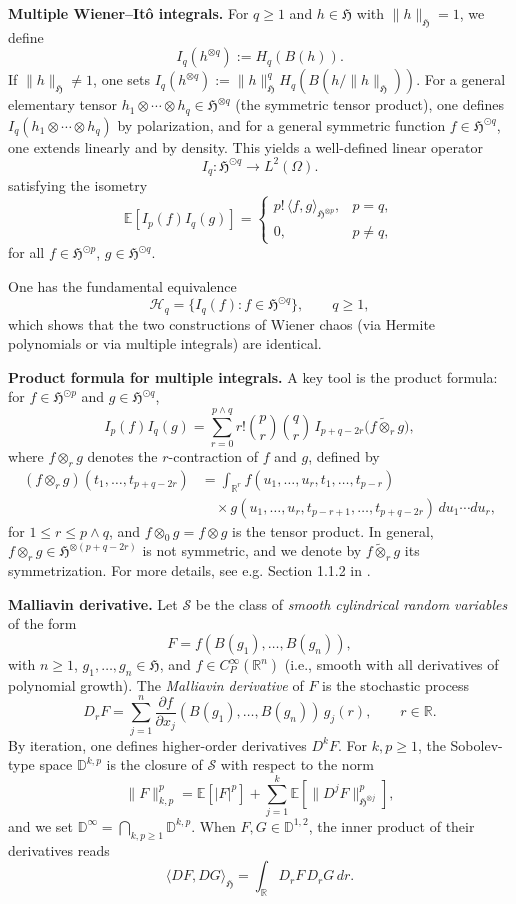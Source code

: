 \documentclass[a4paper,10pt]{article}
\theoremstyle{definition}
\theoremstyle{plain}
\newcommand{\R}{\mathbb{R}}
\newcommand{\E}{\mathbb{E}}
\newcommand\HHH{\mathfrak{H}}
\newcommand\D{\mathbb{D}}
\newcommand\1{\mathbbm{1}}
\begin{document}
\medskip
\noindent\textbf{Multiple Wiener–Itô integrals.}  
For $q\ge1$ and $h\in\HHH$ with $\|h\|_{\HHH}=1$, we define
\[
I_q(h^{\otimes q}) := H_q(B(h)).
\]
If $\|h\|_{\HHH}\ne1$, one sets $I_q(h^{\otimes q}) := \|h\|_{\HHH}^q H_q(B(h/\|h\|_{\HHH}))$.  
For a general elementary tensor $h_1\otimes\cdots\otimes h_q\in\HHH^{\otimes q}$ (the symmetric tensor product), one defines $I_q(h_1\otimes\cdots\otimes h_q)$ by polarization, and for a general symmetric function $f\in\HHH^{\odot q}$, one extends linearly and by density.  
This yields a well-defined linear operator
\[
I_q:\HHH^{\odot q}\to L^2(\Omega).
\]
satisfying the isometry
\[
\E[I_p(f)I_q(g)] =
\begin{cases}
p!\,\langle f,g\rangle_{\HHH^{\otimes p}}, & p=q,\\
0, & p\ne q,
\end{cases}
\]
for all $f\in\HHH^{\odot p}$, $g\in\HHH^{\odot q}$.  

One has the fundamental equivalence
$$
\mathcal H_q = \{ I_q(f): f\in \HHH^{\odot q}\}, \qquad q\ge1,
$$
which shows that the two constructions of Wiener chaos (via Hermite polynomials  or via multiple integrals) are identical.

\medskip

\noindent\textbf{Product formula for multiple integrals.}  
A key tool is the product formula: for $f\in\HHH^{\odot p}$ and $g\in\HHH^{\odot q}$,
\begin{equation}\label{prod}
I_p(f)I_q(g)= \sum_{r=0}^{p\wedge q} r!\binom{p}{r}\binom{q}{r}\,
I_{p+q-2r}\big(f\widetilde{\otimes}_r g\big),
\end{equation}
where $f\otimes_r g$ denotes the $r$-contraction of $f$ and $g$, defined by
\begin{align}\label{contra}
(f\otimes_r g)(t_{1},\ldots,t_{p+q-2r})
&= \int_{\R^{r}} f(u_{1},\ldots,u_{r}, t_{1},\ldots,t_{p-r}) \nonumber \\
&\quad \times g(u_{1},\ldots,u_{r}, t_{p-r+1},\ldots,t_{p+q-2r})\,du_{1}\cdots du_{r},
\end{align}
for $1\le r\le p\wedge q$, and $f\otimes_0 g = f\otimes g$ is the tensor product.  
In general, $f\otimes_r g\in\HHH^{\otimes(p+q-2r)}$ is not symmetric, and we denote by $f\widetilde{\otimes}_r g$ its symmetrization.  
For more details, see e.g. Section 1.1.2 in \cite{Nualart}.


\medskip
\noindent\textbf{Malliavin derivative.}  
Let $\mathcal S$ be the class of \emph{smooth cylindrical random variables} of the form
\[
F = f(B(g_1),\dots,B(g_n)),
\]
with $n\ge1$, $g_1,\dots,g_n\in\HHH$, and $f\in C^\infty_P(\R^n)$ (i.e., smooth with all derivatives of polynomial growth).  
The \emph{Malliavin derivative} of $F$ is the stochastic process
\[
D_r F = \sum_{j=1}^n \frac{\partial f}{\partial x_j}(B(g_1),\dots,B(g_n))\, g_j(r), \qquad r\in\R.
\]
By iteration, one defines higher-order derivatives $D^kF$.  
For $k,p\ge1$, the Sobolev-type space $\D^{k,p}$ is the closure of $\mathcal S$ with respect to the norm
\[
\|F\|_{k,p}^p = \E[|F|^p] + \sum_{j=1}^k \E\!\left[\|D^jF\|_{\HHH^{\otimes j}}^p\right],
\]
and we set $\D^\infty = \bigcap_{k,p\ge1}\D^{k,p}$.  
When $F,G\in \D^{1,2}$, the inner product of their derivatives reads
\[
\langle DF,DG\rangle_\HHH = \int_\R D_rF\,D_rG\,dr.
\]
\end{document}
